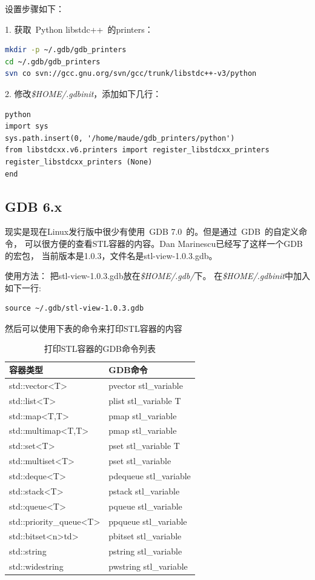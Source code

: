 设置步骤如下：

1. 获取~Python libstdc++~的printers：
\begin{lstlisting}[language={sh}]
mkdir -p ~/.gdb/gdb_printers
cd ~/.gdb/gdb_printers
svn co svn://gcc.gnu.org/svn/gcc/trunk/libstdc++-v3/python
\end{lstlisting}

2. 修改\emph{\$HOME/.gdbinit}，添加如下几行：
\begin{lstlisting}
python
import sys
sys.path.insert(0, '/home/maude/gdb_printers/python')
from libstdcxx.v6.printers import register_libstdcxx_printers
register_libstdcxx_printers (None)
end
\end{lstlisting}

\subsection{GDB 6.x}
现实是现在Linux发行版中很少有使用~GDB 7.0~的。但是通过~GDB~的自定义命令，
可以很方便的查看STL容器的内容。Dan Marinescu已经写了这样一个GDB的宏包，
当前版本是1.0.3，文件名是stl-view-1.0.3.gdb。

使用方法：
把stl-view-1.0.3.gdb放在\emph{\$HOME/.gdb/}下。
在\emph{\$HOME/.gdbinit}中加入如下一行:
\begin{lstlisting}
source ~/.gdb/stl-view-1.0.3.gdb
\end{lstlisting}

然后可以使用下表的命令来打印STL容器的内容
   
 
\begin{table}[!bhp]
\begin{tabular}{l|l}
\hline
\hline
容器类型 & GDB命令      \\
\hline
std::vector<T>          &       pvector stl\_variable    \\
std::list<T>	        &       plist stl\_variable T    \\
std::map<T,T>	        &       pmap stl\_variable       \\
std::multimap<T,T>      &       pmap stl\_variable       \\
std::set<T>	        &       pset stl\_variable T     \\
std::multiset<T>        &       pset stl\_variable       \\
std::deque<T>	        &       pdequeue stl\_variable   \\
std::stack<T>	        &       pstack stl\_variable     \\
std::queue<T>	        &       pqueue stl\_variable     \\
std::priority\_queue<T>	&       ppqueue stl\_variable    \\
std::bitset<n>td>	&       pbitset stl\_variable    \\
std::string	        &       pstring stl\_variable    \\
std::widestring	        &       pwstring stl\_variable   \\
\hline
\hline
\end{tabular}
\caption{打印STL容器的GDB命令列表}
\end{table}


